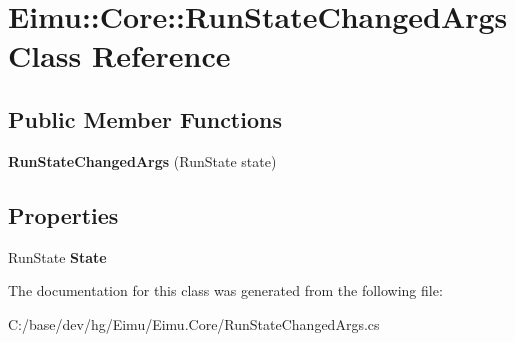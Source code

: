 \hypertarget{class_eimu_1_1_core_1_1_run_state_changed_args}{
\section{Eimu::Core::RunStateChangedArgs Class Reference}
\label{class_eimu_1_1_core_1_1_run_state_changed_args}
}
\subsection*{Public Member Functions}
\begin{DoxyCompactItemize}
\item 
\hypertarget{class_eimu_1_1_core_1_1_run_state_changed_args_a4b9e964c3d5fa404bd4b51c0fd35ef42}{
{\bfseries RunStateChangedArgs} (RunState state)}
\label{class_eimu_1_1_core_1_1_run_state_changed_args_a4b9e964c3d5fa404bd4b51c0fd35ef42}

\end{DoxyCompactItemize}
\subsection*{Properties}
\begin{DoxyCompactItemize}
\item 
\hypertarget{class_eimu_1_1_core_1_1_run_state_changed_args_a7e21c225f9276ab3912c2fbe35e4a7a8}{
RunState {\bfseries State}}
\label{class_eimu_1_1_core_1_1_run_state_changed_args_a7e21c225f9276ab3912c2fbe35e4a7a8}

\end{DoxyCompactItemize}


The documentation for this class was generated from the following file:\begin{DoxyCompactItemize}
\item 
C:/base/dev/hg/Eimu/Eimu.Core/RunStateChangedArgs.cs\end{DoxyCompactItemize}
